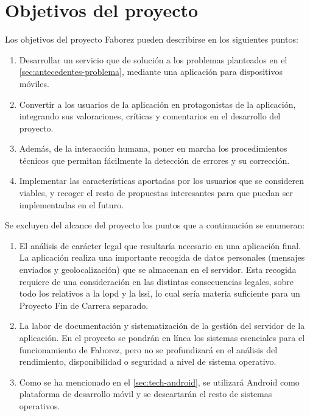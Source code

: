 \documentclass[main]{subfiles}
\begin{document}
\section{Objetivos del proyecto}

Los objetivos del proyecto Faborez pueden describirse en los siguientes puntos:

\begin{enumerate}
  \item Desarrollar un servicio que de solución a los problemas planteados en el \cref{sec:antecedentes-problema}, mediante una aplicación para dispositivos móviles.
  \item Convertir a los usuarios de la aplicación en protagonistas de la aplicación, integrando sus valoraciones, críticas y comentarios en el desarrollo del proyecto.
  \item Además, de la interacción humana, poner en marcha los procedimientos técnicos que permitan fácilmente la detección de errores y su corrección.
  \item Implementar las características aportadas por los usuarios que se consideren viables, y recoger el resto de propuestas interesantes para que puedan ser implementadas en el futuro.
\end{enumerate}

Se excluyen del alcance del proyecto los puntos que a continuación se enumeran:

\begin{enumerate}
  \item El análisis de carácter legal que resultaría necesario en una aplicación final. La aplicación realiza una importante recogida de datos personales (mensajes enviados y geolocalización) que se almacenan en el servidor. Esta recogida requiere de una consideración en las distintas consecuencias legales, sobre todo los relativos a la \gls{lopd} y la \gls{lssi}, lo cual sería materia suficiente para un Proyecto Fin de Carrera separado.
  \item La labor de documentación y sistematización de la gestión del servidor de la aplicación. En el proyecto se pondrán en línea los sistemas esenciales para el funcionamiento de Faborez, pero no se profundizará en el análisis del rendimiento, disponibilidad o seguridad a nivel de sistema operativo.
  \item Como se ha mencionado en el \cref{sec:tech-android}, se utilizará Android como plataforma de desarrollo móvil y se descartarán el resto de sistemas operativos.
\end{enumerate}
\end{document}

